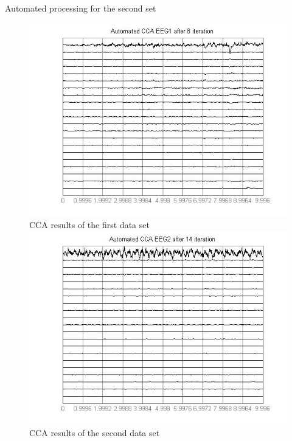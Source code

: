 \documentclass[t,12pt,english
\ifx\beamermode\undefined\else,\beamermode\fi
]{beamer}
\begin{document}
 
 
\begin{frame}{Automated processing for the second set }


\begin{figure}[!htbp]
%
\centering
\includegraphics[width=1\textwidth]{27.jpg}\\
\tiny{CCA results of the first data set}\label{toda1}
\endminipage\hfill
{}%
\centering
\includegraphics[width=1\textwidth]{28.jpg}\\
\tiny{CCA results of the second data set}\label{toda2}
\endminipage\hfill
\end{figure}    
    
\end{frame}      
    
\end{document}
